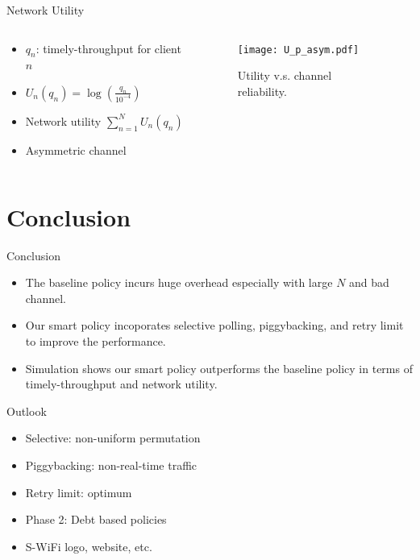 \documentclass{beamer}
\begin{document}
\begin{frame}{Network Utility}
\begin{columns}
  \begin{column}{.5\textwidth}
  \begin{itemize}
    \item $q_n$: timely-throughput for client $n$
    \item $U_n(q_n) = \log (\frac{q_n}{10^{-4}})$
    \item Network utility $\sum_{n=1}^{N} U_n(q_n)$
    \item Asymmetric channel
  \end{itemize}
  \end{column}
  \begin{column}{.5\textwidth}
\begin{figure}[htbp]
  \centering
  \texttt{[image: U\_p\_asym.pdf]}
  \caption{Utility v.s. channel reliability.}
\end{figure}
  \end{column}
\end{columns}
\end{frame}

\section*{Conclusion}
\begin{frame}{Conclusion}
  \begin{itemize}
    \item The baseline policy incurs huge overhead especially with large $N$ and bad channel.
    \item Our smart policy incoporates selective polling, piggybacking, and
      retry limit to improve the performance.
    \item Simulation shows our smart policy outperforms the baseline policy in
      terms of timely-throughput and network utility.
  \end{itemize}
\end{frame}

\begin{frame}{Outlook}
  \begin{itemize}
    \item Selective: non-uniform permutation
    \item Piggybacking: non-real-time traffic
    \item Retry limit: optimum
    \item Phase 2: Debt based policies
    \item S-WiFi logo, website, etc.
  \end{itemize}
\end{frame}
\end{document}
